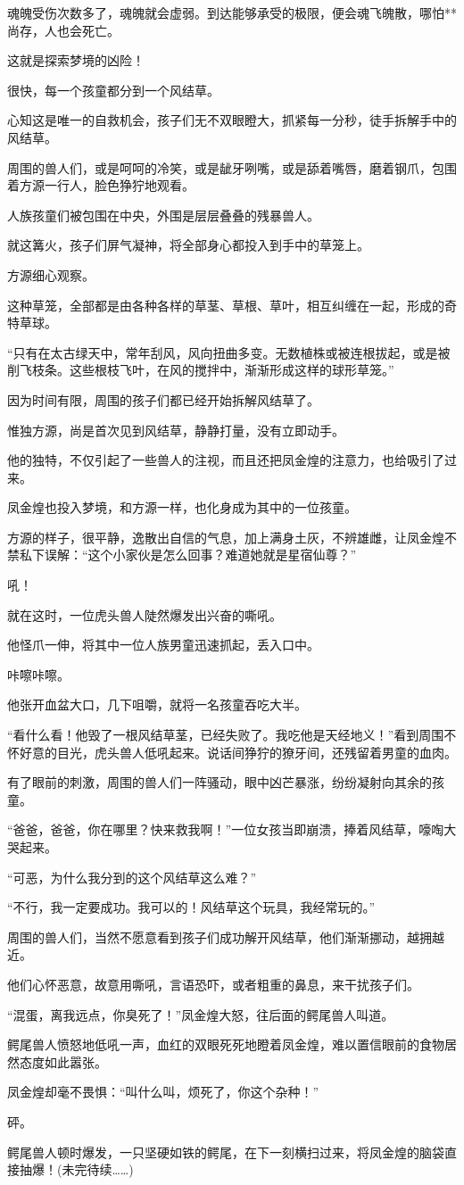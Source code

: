 \begin{this_body}
魂魄受伤次数多了，魂魄就会虚弱。到达能够承受的极限，便会魂飞魄散，哪怕**尚存，人也会死亡。

这就是探索梦境的凶险！

很快，每一个孩童都分到一个风结草。

心知这是唯一的自救机会，孩子们无不双眼瞪大，抓紧每一分秒，徒手拆解手中的风结草。

周围的兽人们，或是呵呵的冷笑，或是龇牙咧嘴，或是舔着嘴唇，磨着钢爪，包围着方源一行人，脸色狰狞地观看。

人族孩童们被包围在中央，外围是层层叠叠的残暴兽人。

就这篝火，孩子们屏气凝神，将全部身心都投入到手中的草笼上。

方源细心观察。

这种草笼，全部都是由各种各样的草茎、草根、草叶，相互纠缠在一起，形成的奇特草球。

“只有在太古绿天中，常年刮风，风向扭曲多变。无数植株或被连根拔起，或是被削飞枝条。这些根枝飞叶，在风的搅拌中，渐渐形成这样的球形草笼。”

因为时间有限，周围的孩子们都已经开始拆解风结草了。

惟独方源，尚是首次见到风结草，静静打量，没有立即动手。

他的独特，不仅引起了一些兽人的注视，而且还把凤金煌的注意力，也给吸引了过来。

凤金煌也投入梦境，和方源一样，也化身成为其中的一位孩童。

方源的样子，很平静，逸散出自信的气息，加上满身土灰，不辨雄雌，让凤金煌不禁私下误解：“这个小家伙是怎么回事？难道她就是星宿仙尊？”

吼！

就在这时，一位虎头兽人陡然爆发出兴奋的嘶吼。

他怪爪一伸，将其中一位人族男童迅速抓起，丢入口中。

咔嚓咔嚓。

他张开血盆大口，几下咀嚼，就将一名孩童吞吃大半。

“看什么看！他毁了一根风结草茎，已经失败了。我吃他是天经地义！”看到周围不怀好意的目光，虎头兽人低吼起来。说话间狰狞的獠牙间，还残留着男童的血肉。

有了眼前的刺激，周围的兽人们一阵骚动，眼中凶芒暴涨，纷纷凝射向其余的孩童。

“爸爸，爸爸，你在哪里？快来救我啊！”一位女孩当即崩溃，捧着风结草，嚎啕大哭起来。

“可恶，为什么我分到的这个风结草这么难？”

“不行，我一定要成功。我可以的！风结草这个玩具，我经常玩的。”

周围的兽人们，当然不愿意看到孩子们成功解开风结草，他们渐渐挪动，越拥越近。

他们心怀恶意，故意用嘶吼，言语恐吓，或者粗重的鼻息，来干扰孩子们。

“混蛋，离我远点，你臭死了！”凤金煌大怒，往后面的鳄尾兽人叫道。

鳄尾兽人愤怒地低吼一声，血红的双眼死死地瞪着凤金煌，难以置信眼前的食物居然态度如此嚣张。

凤金煌却毫不畏惧：“叫什么叫，烦死了，你这个杂种！”

砰。

鳄尾兽人顿时爆发，一只坚硬如铁的鳄尾，在下一刻横扫过来，将凤金煌的脑袋直接抽爆！(未完待续……)

\end{this_body}

